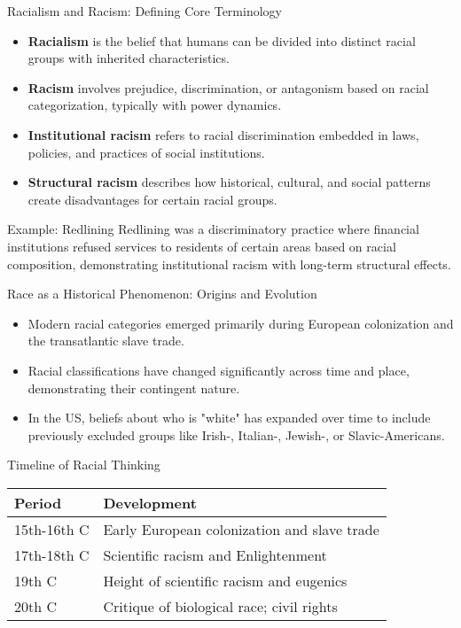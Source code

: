 \documentclass{beamer}
\begin{document}
	\begin{frame}{Racialism and Racism: Defining Core Terminology}
		\begin{itemize}
			\item \textbf{Racialism} is the belief that humans can be divided into distinct racial groups with inherited characteristics.
			\item \textbf{Racism} involves prejudice, discrimination, or antagonism based on racial categorization, typically with power dynamics.
			\item \textbf{Institutional racism} refers to racial discrimination embedded in laws, policies, and practices of social institutions.
			\item \textbf{Structural racism} describes how historical, cultural, and social patterns create disadvantages for certain racial groups.
		\end{itemize}
		
		\begin{exampleblock}{Example: Redlining}
			Redlining was a discriminatory practice where financial institutions refused services to residents of certain areas based on racial composition, demonstrating institutional racism with long-term structural effects.
		\end{exampleblock}
	\end{frame}
	
	\begin{frame}{Race as a Historical Phenomenon: Origins and Evolution}
		\begin{itemize}
			\item Modern racial categories emerged primarily during European colonization and the transatlantic slave trade.
			\item Racial classifications have changed significantly across time and place, demonstrating their contingent nature.
			\item In the US, beliefs about who is "white" has expanded over time to include previously excluded groups like Irish-, Italian-, Jewish-, or Slavic-Americans.
		\end{itemize}
		
		\begin{block}{Timeline of Racial Thinking}
			\begin{tabular}{|l|l|}
				\hline
				\textbf{Period} & \textbf{Development} \\
				\hline
				15th-16th C & Early European colonization and slave trade \\
				17th-18th C & Scientific racism and Enlightenment \\
				19th C & Height of scientific racism and eugenics \\
				20th C & Critique of biological race; civil rights \\
				\hline
			\end{tabular}
		\end{block}
	\end{frame}
	
\end{document}
